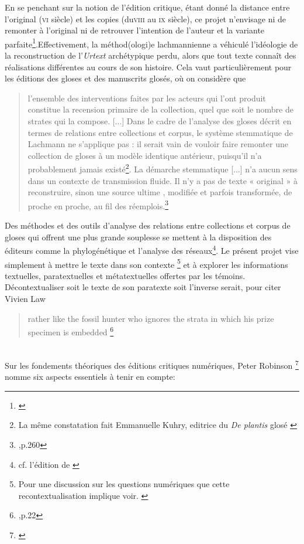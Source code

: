 \documentclass[a4paper, twoside, 12pt]{book}
\begin{document}
En se penchant sur la notion de l'édition critique, étant donné la distance entre l’original (\textsc{vi}\ieme{} siècle) et les copies (du\textsc{viii}\ieme{} au \textsc{ix}\ieme{} siècle), ce projet n’envisage ni de remonter à l’original ni de retrouver l’intention de l’auteur et la variante parfaite\footnote{\cite{cerquiglini1990eloge}}.Effectivement, la méthod(ologi)e lachmannienne a véhiculé l’idéologie de la reconstruction de l’\textit{Urtext} archétypique perdu, alors que tout texte connaît des réalisations différentes au cours de son histoire. Cela vaut particulièrement pour les éditions des gloses et des manuscrits glosés, où on considère  que \blockquote{l’ensemble des interventions faites par les acteurs qui l’ont produit constitue la recension primaire de la collection, quel que soit le nombre de strates qui la compose. [...] Dans le cadre de l’analyse des gloses décrit en termes de relations entre collections et corpus, le système stemmatique de Lachmann ne s’applique pas : il serait vain de vouloir faire remonter une collection de gloses à un modèle identique antérieur, puisqu’il n’a probablement jamais existé\footnote{ La même constatation fait Emmanuelle Kuhry, editrice du \textit{De plantis} glosé \cite{kuhry2020medieval}}. La démarche stemmatique [...] n'a aucun sens dans un contexte de transmission fluide. Il n’y a pas de texte « original » à reconstruire, sinon une source \og{} ultime \fg{}, modifiée et parfois transformée, de proche en proche, au fil des réemplois.\footnote{\cite{cinato2015priscien},p.260}}. Des méthodes et des outils d'analyse des relations entre collections et corpus de gloses qui offrent une plus grande souplesse se mettent à la disposition des éditeurs comme la phylogénétique et l'analyse des réseaux\footnote{cf. l'édition de \cite{steinova2021glosses}}. Le présent projet vise  simplement à mettre le texte dans son contexte \footnote{Pour une discussion sur les questions numériques que cette recontextualisation implique voir. \cite{pierazzo2011putting}} et à explorer les informations textuelles, paratextuelles et métatextuelles offertes par les témoins. Décontextualiser soit le texte de son paratexte soit l'inverse serait, pour citer Vivien Law \blockquote{rather like the fossil hunter who ignores the strata in which his prize specimen is embedded \footnote{\cite{law1997grammar},p.22}}.\\

Sur les fondements théoriques des éditions critiques numériques, Peter Robinson \footnote{\cite{robinson2001critical}} nomme six aspects essentiels à tenir en compte:
\end{document}
